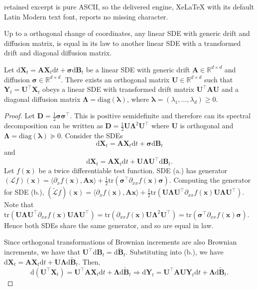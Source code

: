 \documentclass[10pt,a4paper]{amsart}
\newcommand{\diff}{\mathrm{d}}
\newcommand{\tr}{\mathrm{tr}}
\begin{document}
retained excerpt is pure ASCII, so the delivered engine, XeLaTeX with its default Latin Modern text font, reports no missing character.
\begin{lem}
  Up to a orthogonal change of coordinates, any linear SDE with generic drift and diffusion matrix, is equal in its law to another linear SDE with a transformed drift and diagonal diffusion matrix.
  \label{lem:diagonal_diffusion}
\end{lem}

\begin{mylem}
  Let $\diff \bm{X}_t = \bm{A} \bm{X}_t \diff t + \bm{\sigma} \diff \bm{B}_t$ be a linear SDE with generic drift $\bm{A} \in \mathbb{R}^{d \times d}$ and diffusion $\bm{\sigma} \in \mathbb{R}^{d \times d}$. There exists an orthogonal matrix $\bm{U} \in \mathbb{R}^{d \times d}$ such that $\bm{Y}_t = \bm{U}^\top \bm{X}_t$ obeys a linear SDE with transformed drift matrix $\bm{U}^\top \bm{A} \bm{U}$ and a diagonal diffusion matrix $\bm{\Lambda} = \mathrm{diag}(\bm{\lambda})$, where $\bm{\lambda} = (\lambda_1, \ldots, \lambda_d) \ge 0$. 
\end{mylem}

\begin{proof}
Let $\bm{D} = \frac{1}{2} \bm{\sigma} \bm{\sigma}^\top$. This is positive semidefinite and therefore can its spectral decomposition can be written as $\bm{D} = \frac{1}{2} \bm{U} \bm{\Lambda}^2 \bm{U}^\top$ where $\bm{U}$ is orthogonal and $\bm{\Lambda} = \mathrm{diag}(\bm{\lambda}) \succeq 0$. Consider the SDEs
\[
  \diff \bm{X}_t = \bm{A} \bm{X}_t \diff t + \bm{\sigma} \diff \bm{B}_t \tag{a.}
\]
and
\[
  \diff \bm{X}_t = \bm{A} \bm{X}_t \diff t + \bm{U} \bm{\Lambda} \bm{U}^\top \diff \bm{B}_t. \tag{b.}
\]
Let $f(\bm{x})$ be a twice differentiable test function. SDE (a.) has generator $(\mathcal{L} f)(\bm{x}) = \langle \partial_x f(\bm{x}), \bm{A}\bm{x} \rangle + \frac{1}{2} \tr(\bm{\sigma}^\top \partial_{xx} f(\bm{x}) \bm{\sigma})$. 
Computing the generator for SDE (b.),
$(\tilde{\mathcal{L}} f)(\bm{x}) = \langle \partial_x f(\bm{x}), \bm{A}\bm{x} \rangle + \frac{1}{2} \tr( \bm{U} \bm{\Lambda} \bm{U}^\top \partial_{xx} f(\bm{x}) \bm{U} \bm{\Lambda} \bm{U}^\top)$.
Note that $\tr( \bm{U} \bm{\Lambda} \bm{U}^\top \partial_{xx} f(\bm{x}) \bm{U} \bm{\Lambda} \bm{U}^\top) = \tr(\partial_{xx} f(\bm{x}) \bm{U} \bm{\Lambda}^2 \bm{U}^\top) = \tr(\bm{\sigma}^\top \partial_{xx} f(\bm{x}) \bm{\sigma})$. 
Hence both SDEs share the same generator, and so are equal in law. 

Since orthogonal transformations of Brownian increments are also Brownian increments, we have that $\bm{U}^\top \diff \bm{B}_t = \diff \tilde{\bm{B}}_t$. Substituting into (b.), we have $\diff \bm{X}_t = \bm{A} \bm{X}_t \diff t + \bm{U} \bm{\Lambda} \diff \tilde{\bm{B}}_t$. Then,
$$ \diff (\bm{U}^\top \bm{X}_t) = \bm{U}^\top \bm{A} \bm{X}_t \diff t + \bm{\Lambda} \diff \tilde{\bm{B}}_t \Longrightarrow \diff \bm{Y}_t = \bm{U}^\top \bm{A} \bm{U} \bm{Y}_t \diff t + \bm{\Lambda} \diff \tilde{\bm{B}}_t.$$
\end{proof}
\end{document}
